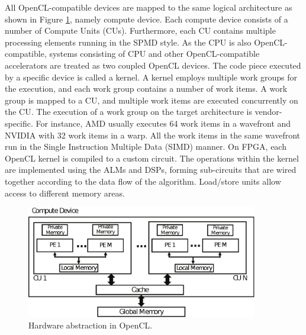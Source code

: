 All OpenCL-compatible devices are mapped to the same logical architecture as shown in Figure \ref{fig:gpuarchitecture}, namely compute device. Each compute device consists of a number of Compute Units (CUs). Furthermore, each CU contains multiple processing elements running in the SPMD style. As the CPU is also OpenCL-compatible, systems consisting of CPU and other OpenCL-compatible accelerators are treated as two coupled OpenCL devices. The code piece executed by a specific device is called a kernel. A kernel employs multiple work groups for the execution, and each work group contains a number of work items. A work group is mapped to a CU, and multiple work items are executed concurrently on the CU. The execution of a work group on the target architecture is vendor-specific. For instance, AMD usually executes 64 work items in a wavefront and NVIDIA with 32 work items in a warp. All the work items in the same wavefront run in the Single Instruction Multiple Data (SIMD) manner. On FPGA, each OpenCL kernel is compiled to a custom circuit. The operations within the kernel are implemented using the ALMs and DSPs, forming sub-circuits that are wired together according to the data flow of the algorithm. Load/store units allow access to different memory areas.

\begin{figure}
	\centering
    \includegraphics[width=0.90\textwidth]{figures/gpuarchitecture.eps}
    \caption{Hardware abstraction in OpenCL.} \label{fig:gpuarchitecture}
\end{figure}

